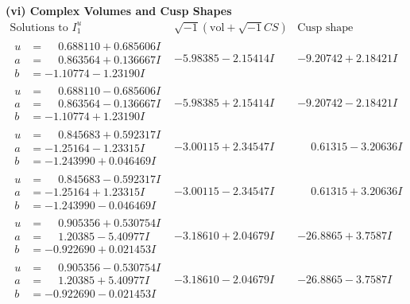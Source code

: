 \documentclass[1p]{elsarticle_modified}
\theoremstyle{definition}
\newcommand{\I}{\sqrt{-1}}
\begin{document}
\newpage\flushleft \textbf{(vi) Complex Volumes and Cusp Shapes}
$$\begin{array}{c|c|c}  
\text{Solutions to }I^u_{1}& \I (\text{vol} + \sqrt{-1}CS) & \text{Cusp shape}\\
 \hline 
\begin{aligned}
u &= \phantom{-}0.688110 + 0.685606 I \\
a &= \phantom{-}0.863564 + 0.136667 I \\
b &= -1.10774 - 1.23190 I\end{aligned}
 & -5.98385 - 2.15414 I & -9.20742 + 2.18421 I \\ \hline\begin{aligned}
u &= \phantom{-}0.688110 - 0.685606 I \\
a &= \phantom{-}0.863564 - 0.136667 I \\
b &= -1.10774 + 1.23190 I\end{aligned}
 & -5.98385 + 2.15414 I & -9.20742 - 2.18421 I \\ \hline\begin{aligned}
u &= \phantom{-}0.845683 + 0.592317 I \\
a &= -1.25164 - 1.23315 I \\
b &= -1.243990 + 0.046469 I\end{aligned}
 & -3.00115 + 2.34547 I & \phantom{-}0.61315 - 3.20636 I \\ \hline\begin{aligned}
u &= \phantom{-}0.845683 - 0.592317 I \\
a &= -1.25164 + 1.23315 I \\
b &= -1.243990 - 0.046469 I\end{aligned}
 & -3.00115 - 2.34547 I & \phantom{-}0.61315 + 3.20636 I \\ \hline\begin{aligned}
u &= \phantom{-}0.905356 + 0.530754 I \\
a &= \phantom{-}1.20385 - 5.40977 I \\
b &= -0.922690 + 0.021453 I\end{aligned}
 & -3.18610 + 2.04679 I & -26.8865 + 3.7587 I \\ \hline\begin{aligned}
u &= \phantom{-}0.905356 - 0.530754 I \\
a &= \phantom{-}1.20385 + 5.40977 I \\
b &= -0.922690 - 0.021453 I\end{aligned}
 & -3.18610 - 2.04679 I & -26.8865 - 3.7587 I \\ \hline\begin{aligned}

\end{aligned}
\end{array}$$
\end{document}
